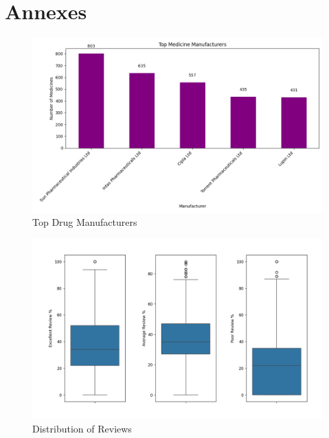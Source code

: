 \documentclass[sigconf]{acmart}
\begin{document}
\appendix
\section{Annexes}

\begin{figure}[H]
	\centering
	\includegraphics[width=\linewidth]{graphic1.png}
	\caption{Top Drug Manufacturers}
	\label{fig:topManufacturers}
  \end{figure}

\begin{figure}[H]
	\centering
	\includegraphics[width=\linewidth]{graphic2.png}
	\caption{Distribution of Reviews}
	\label{fig:reviewDistribution}
  \end{figure}
\end{document}
